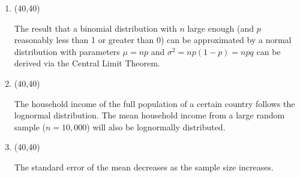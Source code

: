 \documentclass[11pt,twoside]{article}
\numberwithin{equation}{section}
\newcommand{\?}{\stackrel{?}{=}}
\newcommand{\gr}{\color{green!40!black}}
\begin{document}
\begin{enumerate}[\bf (i)]
  
  

  
\item \hfill
  \begin{minipage}{.1\linewidth}
    \framebox(40,40){\gr  }
  \end{minipage}\quad
  \begin{minipage}{.85\linewidth}
    The result that a binomial distribution with $n$ large enough (and $p$ reasonably less than 1 or greater than 0) can
    be approximated by a normal distribution with parameters $\mu = np$ and $\sigma^{2} = np(1-p) = npq$ can be derived
    via the Central Limit Theorem.  
  \end{minipage}

  \smallskip
  
\item \hfill
  \begin{minipage}{.1\linewidth}
    \framebox(40,40){\gr  }
  \end{minipage}\quad
  \begin{minipage}{.85\linewidth}
    The household income of the full population of a certain country follows the lognormal distribution. The mean
    household income from a large random sample ($n = 10,000$) will also be lognormally distributed.
   \end{minipage}

  \smallskip

\item \hfill
  \begin{minipage}{.1\linewidth}
    \framebox(40,40){\gr  }
  \end{minipage}\quad
  \begin{minipage}{.85\linewidth}
    The standard error of the mean decreases as the sample size increases.
   \end{minipage}

\end{enumerate}
\end{document}
